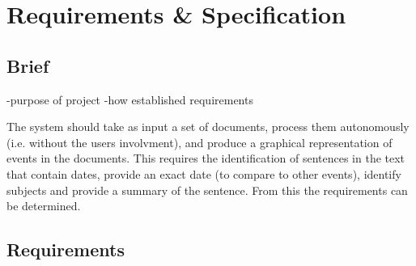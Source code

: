 \chapter{Requirements \& Specification}
\section{Brief}
-purpose of project
-how established requirements
\par The system should take as input a set of documents, process them autonomously (i.e. without the users involvment), and produce a graphical representation of events in the documents. This requires the identification of sentences in the text that contain dates, provide an exact date (to compare to other events), identify subjects and provide a summary of the sentence. From this the requirements can be determined.

\section {Requirements}
